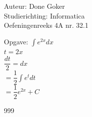 \documentclass[a4paper]{article}
\begin{document}
  
\noindent \large Auteur: Done Goker \\
\noindent \large Studierichting: Informatica\\
\noindent \large Oefeningenreeks 4A nr. 32.1\\

\medskip

\normalsize

Opgave:
$\displaystyle\int e^{2x} dx$ \\

$t = 2x$ \\

$ \dfrac{dt}{2}  = dx$ \\

$= \dfrac{1}{2}\displaystyle\int e^tdt $ \\

$=\dfrac{1}{2} e^{2x} + C$

\begin{thebibliography}{999}
\end{thebibliography}
\end{document}
